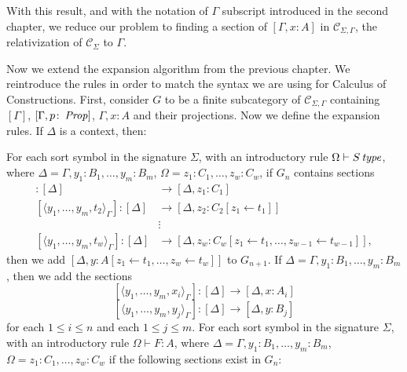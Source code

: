 With this result, and with the notation of $\Gamma$ subscript introduced in the second chapter, we reduce our problem to 
finding a section of $[ \Gamma, x \colon A ]$ in $\mathcal{C}_{\Sigma, \Gamma}$, the relativization of $\mathcal{C}_\Sigma$
to $\Gamma$.

Now we extend the expansion algorithm from the previous chapter. We reintroduce the rules in order to match the syntax we are 
using for Calculus of Constructions.
First, consider $G$ to be a finite subcategory of $\mathcal{C}_{\Sigma, \Gamma}$ containing $[\Gamma]$,
$[\Gamma, p \colon \operatorname{\mathit{Prop}}]$, $\Gamma, x \colon A$ and their projections.
Now we define the expansion rules. If $\Delta$ is a context, then:
\begin{enumerate}
        For each sort symbol in the signature $\Sigma$, with an introductory rule $\Omega \vdash S \operatorname{\mathit{\space type}}$,
        where $\Delta = \Gamma, y_1 \colon B_1, \dots, y_m \colon B_m$, $\Omega = z_1 \colon C_1, \dots, z_w \colon C_w$,
        if $G_n$ contains sections
        \begin{align*}
            [\langle y_1, \dots, y_m, t_1 \rangle_\Gamma] \colon [\Delta] &\to [\Delta, z_1 \colon C_1] \\
            [\langle y_1, \dots, y_m, t_2 \rangle_\Gamma] \colon [\Delta] &\to [\Delta, z_2 \colon C_2[z_1 \leftarrow t_1]] \\
            &\vdots \\
            [\langle y_1, \dots, y_m, t_w \rangle_\Gamma] \colon [\Delta] &\to [\Delta, z_w \colon C_w[z_1 \leftarrow t_1, \dots, z_{w-1} \leftarrow t_{w-1}]],
        \end{align*}
        then we add $[ \Delta, y \colon A[z_1  \leftarrow  t_1, \dots, z_w  \leftarrow  t_w] ]$ to $G_{n+1}$.
        If $\Delta = \Gamma, y_1 \colon B_1, \dots, y_m \colon B_m$, then we add the sections 
        \[
            [\langle y_1, \dots, y_m, x_i \rangle_\Gamma] \colon [\Delta] \to [\Delta, x \colon A_i]
        \] \[
            [\langle y_1, \dots, y_m, y_j \rangle_\Gamma] \colon [\Delta] \to [\Delta, y \colon B_j]
        \]
        for each $1 \leq i \leq n$ and each $1 \leq j \leq m$.
        For each sort symbol in the signature $\Sigma$, with an introductory rule $\Omega \vdash F \colon A$,
        where $\Delta = \Gamma, y_1 \colon B_1, \dots, y_m \colon B_m$, $\Omega = z_1 \colon C_1, \dots, z_w \colon C_w$
        if the following sections exist in $G_n$:

\end{enumerate}
